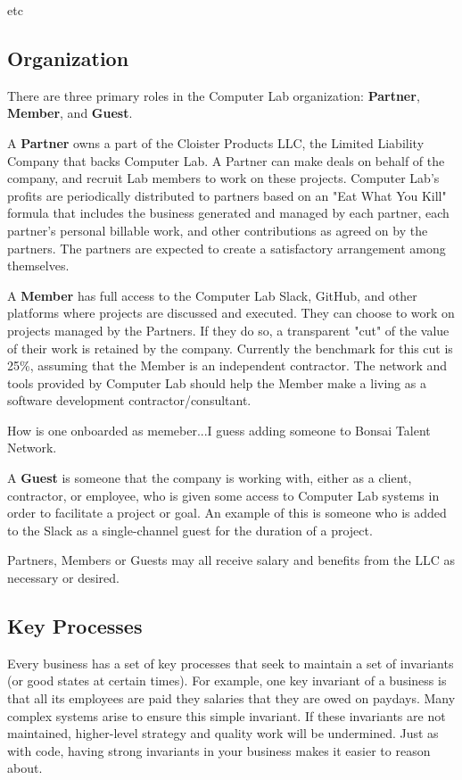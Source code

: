 \documentclass[12pt]{article}
\begin{document}
etc

\subsection{Organization}

There are three primary roles in the Computer Lab organization: \textbf{Partner},
\textbf{Member}, and \textbf{Guest}.

A \textbf{Partner} owns a part of the Cloister Products LLC, the Limited Liability
Company that backs Computer Lab.  A Partner can make deals on behalf of the
company, and recruit Lab members to work on these projects.  Computer Lab's
profits are periodically distributed to partners based on an "Eat What You Kill"
formula that includes the business generated and managed by each partner, each
partner's personal billable work, and other contributions as agreed on by the
partners.  The partners are expected to create a satisfactory arrangement among
themselves.

A \textbf{Member} has full access to the Computer Lab Slack, GitHub, and other
platforms where projects are discussed and executed.  They can choose to work on
projects managed by the Partners.  If they do so, a transparent "cut" of the
value of their work is retained by the company.  Currently the benchmark for
this cut is 25\%, assuming that the Member is an independent contractor.  The
network and tools provided by Computer Lab should help the Member make a living
as a software development contractor/consultant.

How is one onboarded as memeber...I guess adding someone to Bonsai Talent
Network.

A \textbf{Guest} is someone that the company is working with, either as a client,
contractor, or employee, who is given some access to Computer Lab systems in
order to facilitate a project or goal.  An example of this is someone who is
added to the Slack as a single-channel guest for the duration of a project.

Partners, Members or Guests may all receive salary and benefits from
the LLC as necessary or desired.

\subsection{Key Processes}
Every business has a set of key processes that seek to maintain a set of
invariants (or good states at certain times). For example, one key invariant of
a business is that all its employees are paid they salaries that they are owed
on paydays. Many complex systems arise to ensure this simple invariant.
If these invariants are not maintained, higher-level strategy and quality work
will be undermined. Just as with code, having strong invariants in your business
makes it easier to reason about.
\end{document}
